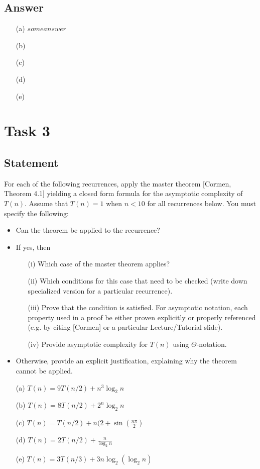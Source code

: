 \documentclass{article}
\begin{document}
\subsection{Answer}
\begin{itemize}
    \setlength\itemsep{0em}
    \item [(a)] $some answer$
    \item [(b)] 
    \item [(c)] 
    \item [(d)] 
    \item [(e)] 
\end{itemize}


\section{Task 3}
\subsection{Statement}
For each of the following recurrences, apply the master theorem [Cormen, Theorem 4.1] yielding a closed form formula for the asymptotic complexity of $T(n)$. Assume that $T(n) = 1$ when $n < 10$ for all recurrences below. You must specify the following:
\begin{itemize}
    \setlength\itemsep{0em}
    \item Can the theorem be applied to the recurrence?
    \item If yes, then
    \begin{enumerate}
        \setlength\itemsep{0em}
        \item [(i)] Which case of the master theorem applies?
        \item [(ii)] Which conditions for this case that need to be checked (write down specialized version for a particular recurrence).
        \item [(iii)] Prove that the condition is satisfied. For asymptotic notation, each property used in a proof  be either proven explicitly or properly referenced (e.g. by citing [Cormen] or a particular Lecture/Tutorial slide).
        \item [(iv)] Provide asymptotic complexity for $T(n)$ using $\Theta$-notation.
    \end{enumerate}
    \item Otherwise, provide an explicit justification, explaining why the theorem cannot be applied.
\end{itemize}
\begin{itemize}
    \setlength\itemsep{0em}
    \item [(a)] $T(n) = 9T(n/2) + n^3\log_2 n$
    \item [(b)] $T(n) = 8T(n/2) + 2^n \log_2 n$
    \item [(c)] $T(n) = T(n/2) + n(2 + \sin(\frac{n\pi}{2})$
    \item [(d)] $T(n) = 2T(n/2) + \frac{n}{\log_2 n}$
    \item [(e)] $T(n) = 3T(n/3) + 3n\log_2(\log_2 n)$
\end{itemize}
\end{document}
